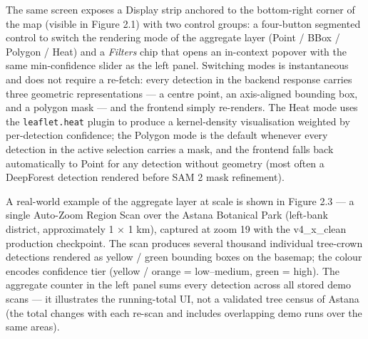 The same screen exposes a Display strip anchored to the bottom-right corner of the map (visible in Figure 2.1) with two control groups: a four-button segmented control to switch the rendering mode of the aggregate layer (Point / BBox / Polygon / Heat) and a \emph{Filters} chip that opens an in-context popover with the same min-confidence slider as the left panel. Switching modes is instantaneous and does not require a re-fetch: every detection in the backend response carries three geometric representations --- a centre point, an axis-aligned bounding box, and a polygon mask --- and the frontend simply re-renders. The Heat mode uses the \texttt{leaflet.heat} plugin to produce a kernel-density visualisation weighted by per-detection confidence; the Polygon mode is the default whenever every detection in the active selection carries a mask, and the frontend falls back automatically to Point for any detection without geometry (most often a DeepForest detection rendered before SAM 2 mask refinement).

A real-world example of the aggregate layer at scale is shown in Figure 2.3 --- a single Auto-Zoom Region Scan over the Astana Botanical Park (left-bank district, approximately 1 × 1 km), captured at zoom 19 with the v4\_x\_clean production checkpoint. The scan produces several thousand individual tree-crown detections rendered as yellow / green bounding boxes on the basemap; the colour encodes confidence tier (yellow / orange = low--medium, green = high). The aggregate counter in the left panel sums every detection across all stored demo scans --- it illustrates the running-total UI, not a validated tree census of Astana (the total changes with each re-scan and includes overlapping demo runs over the same areas).

